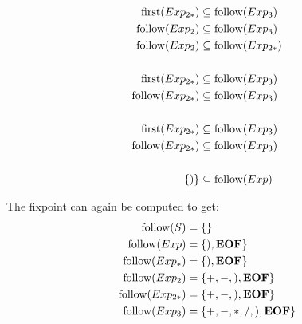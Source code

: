 \begin{exercise}{}
\begin{solution}
\begin{enumerate}
\begin{enumerate}
\begin{multicols}{2}
\begin{align*}
              \operatorname{first}(Exp_{2*}) &\subseteq \operatorname{follow}(Exp_3) \\
              \operatorname{follow}(Exp_2) &\subseteq \operatorname{follow}(Exp_3) \\
              \operatorname{follow}(Exp_2) &\subseteq \operatorname{follow}(Exp_{2*}) \\
              &\\
              \operatorname{first}(Exp_{2*}) &\subseteq \operatorname{follow}(Exp_3) \\
              \operatorname{follow}(Exp_{2*}) &\subseteq \operatorname{follow}(Exp_3) \\
              &\\
              \operatorname{first}(Exp_{2*}) &\subseteq \operatorname{follow}(Exp_3) \\
              \operatorname{follow}(Exp_{2*}) &\subseteq \operatorname{follow}(Exp_3) \\
              &\\
              \{)\} &\subseteq \operatorname{follow}(Exp) \\
            \end{align*}
          \end{multicols}

          The fixpoint can again be computed to get:
          \begin{align*}
            \operatorname{follow}(S) &= \{\} \\
            \operatorname{follow}(Exp) &= \{), \mathbf{EOF}\} \\
            \operatorname{follow}(Exp_*) &= \{), \mathbf{EOF}\} \\
            \operatorname{follow}(Exp_2) &= \{+, -, ), \mathbf{EOF}\} \\
            \operatorname{follow}(Exp_{2*}) &= \{+, -, ), \mathbf{EOF}\} \\
            \operatorname{follow}(Exp_3) &= \{+, -, *, /, ), \mathbf{EOF}\}
          \end{align*}


\end{enumerate}
\end{enumerate}
\end{solution}
\end{exercise}
